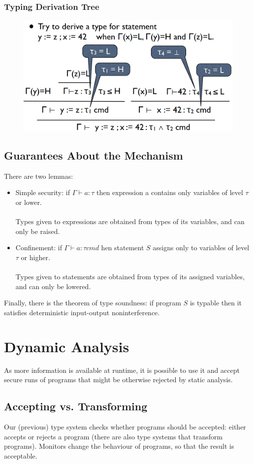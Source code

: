 \documentclass[10pt,a4paper]{report}
\begin{document}
\subsubsection{Typing Derivation Tree}
\begin{figure}[H]
\centering
\includegraphics[scale=0.4]{24.png}
\end{figure}
\subsection{Guarantees About the Mechanism}
There are two lemmas:
\begin{itemize}
\item Simple security: if $\Gamma \vdash a: \tau$ then expression a contains only variables of level $\tau$ or lower.\\
\\
Types given to expressions are obtained from types of its variables, and can only be raised.
\item Confinement: if $\Gamma \vdash a: \tau cmd$ hen statement $S$ assigns only to variables of level $\tau$ or higher.\\
\\
Types given to statements are obtained from types of its assigned variables, and can only be lowered.
\end{itemize}
Finally, there is the theorem of type soundness: if program $S$ is typable then it satisfies deterministic input-output noninterference.

\section{Dynamic Analysis}
As more information is available at runtime, it is possible to use it and accept secure runs of programs that might be otherwise rejected by static analysis.
\subsection{Accepting vs. Transforming}
Our (previous) type system checks whether programs should be accepted: either accepts or rejects a program (there are also type systems that transform programs). Monitors change the behaviour of programs, so that the result is acceptable.
\end{document}

